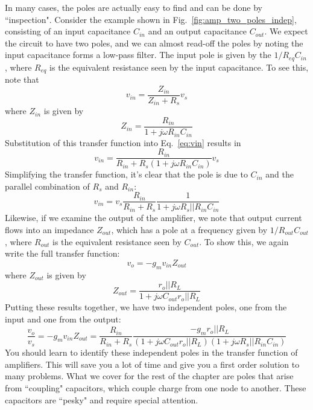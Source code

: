 In many cases, the poles are actually easy to find and can be done by ``inspection".  Consider the example shown in Fig.~\ref{fig:amp_two_poles_indep}, consisting of an input capacitance $C_{in}$ and an output capacitance $C_{out}$.  We expect the circuit to have two poles, and we can almost read-off the poles by noting the input capacitance forms a low-pass filter.  The input pole is given by the $1/R_{eq}C_{in}$, where $R_{eq}$ is the equivalent resistance seen by the input capacitance.  To see this, note that
\begin{equation}
	v_{in} = \frac{Z_{in}}{Z_{in} + R_s} v_s \label{eq:vin}
\end{equation} 
where $Z_{in}$ is given by
\begin{equation}
	Z_{in} = \frac{R_{in}}{1 + j\omega R_{in} C_{in}}
\end{equation}
Substitution of this transfer function into Eq.~\ref{eq:vin} results in
\begin{equation}
	v_{in} = \frac{R_{in}}{R_{in} + R_s(1 + j\omega R_{in} C_{in})} v_s 
\end{equation}
Simplifying the transfer function, it's clear that the pole is due to $C_{in}$ and the parallel combination of $R_s $ and $R_{in}$:
\begin{equation}
	v_{in} = v_s \frac{R_{in}}{R_{in} + R_s} \frac{1}{ 1 + j\omega R_s || R_{in} C_{in}} 
\end{equation}
Likewise, if we examine the output of the amplifier, we note that output current flows into an impedance $Z_{out}$, which has a pole at a frequency given by $1/R_{out}C_{out}$, where $R_{out}$ is the equivalent resistance seen by $C_{out}$.  To show this, we again write the full transfer function:
\begin{equation}
	v_o = -g_m v_{in} Z_{out} 
\end{equation}
where $Z_{out}$ is given by
%
\begin{equation}
	Z_{out} = \frac{r_o || R_L}{1 + j\omega C_{out} r_o || R_L}
\end{equation}
Putting these results together, we have two independent poles, one from the input and one from the output:
\begin{equation}
	\frac{v_o}{v_s} = -g_m v_{in} Z_{out} = \frac{R_{in}}{R_{in} + R_s} \frac{-g_m r_o || R_L}{(1 + j\omega C_{out} r_o || R_L)(1 + j\omega R_s || R_{in} C_{in})}
\end{equation}
You should learn to identify these independent poles in the transfer function of amplifiers.  This will save you a lot of time and give you a first order solution to many problems.  What we cover for the rest of the chapter are poles that arise from ``coupling" capacitors, which couple charge from one node to another. These capacitors are ``pesky" and require special attention.
